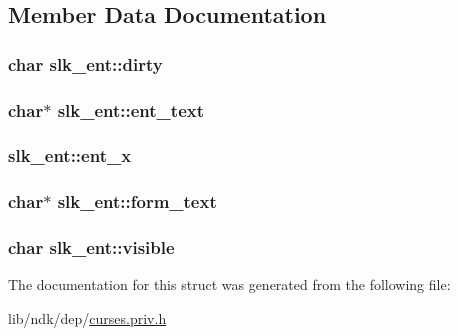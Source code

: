 \subsection{Member Data Documentation}
\hypertarget{structslk__ent_add425867e81f2b0b9b73d23e74aa6fa2}{
\subsubsection[{dirty}]{\setlength{\rightskip}{0pt plus 5cm}char slk\-\_\-ent\-::dirty}}\label{structslk__ent_add425867e81f2b0b9b73d23e74aa6fa2}
\hypertarget{structslk__ent_ab973d77f67247b291b45bb72c0987778}{
\subsubsection[{ent\-\_\-text}]{\setlength{\rightskip}{0pt plus 5cm}char$\ast$ slk\-\_\-ent\-::ent\-\_\-text}}\label{structslk__ent_ab973d77f67247b291b45bb72c0987778}
\hypertarget{structslk__ent_a41420850f35d2f310f7ac1c5bfdd35f5}{
\subsubsection[{ent\-\_\-x}]{ slk\-\_\-ent\-::ent\-\_\-x}}\label{structslk__ent_a41420850f35d2f310f7ac1c5bfdd35f5}
\hypertarget{structslk__ent_a4b5515aa33e05c6a6ab9765c41f9fe65}{
\subsubsection[{form\-\_\-text}]{\setlength{\rightskip}{0pt plus 5cm}char$\ast$ slk\-\_\-ent\-::form\-\_\-text}}\label{structslk__ent_a4b5515aa33e05c6a6ab9765c41f9fe65}
\hypertarget{structslk__ent_a6fdb5301f9f20971c4eda620e39b692a}{
\subsubsection[{visible}]{\setlength{\rightskip}{0pt plus 5cm}char slk\-\_\-ent\-::visible}}\label{structslk__ent_a6fdb5301f9f20971c4eda620e39b692a}


The documentation for this struct was generated from the following file\-:\begin{DoxyCompactItemize}
\item 
lib/ndk/dep/\hyperlink{curses_8priv_8h}{curses.\-priv.\-h}\end{DoxyCompactItemize}
